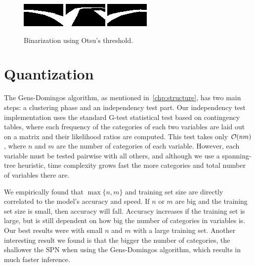 \begin{figure}[h]
  \centering
  \includegraphics[scale=1.75]{imgs/binary_left.png}
  \includegraphics[scale=1.75]{imgs/binary_up.png}
  \includegraphics[scale=1.75]{imgs/binary_right.png}
  \caption{Binarization using Otsu's threshold.\label{fig:bin-otsu}}
\end{figure}

\section{Quantization}

The Gens-Domingos algorithm, as mentioned in~\autoref{chp:structure}, has two main steps: a
clustering phase and an independency test part. Our independency test implementation uses the
standard G-test statistical test based on contingency tables, where each frequency of the
categories of each two variables are laid out on a matrix and their likelihood ratios are computed.
This test takes only $\mathcal{O}(n m)$, where $n$ and $m$ are the number of categories of each variable.
However, each variable must be tested pairwise with all others, and although we use a spanning-tree
heuristic, time complexity grows fast the more categories and total number of variables there are.

We empirically found that $\max\{n,m\}$ and training set size are directly correlated to the
model's accuracy and speed. If $n$ or $m$ are big and the training set size is small, then accuracy
will fall. Accuracy increases if the training set is large, but is still dependent on how big the
number of categories in variables is. Our best results were with small $n$ and $m$ with a large
training set. Another interesting result we found is that the bigger the number of categories, the
shallower the SPN when using the Gens-Domingos algorithm, which results in much faster inference.


